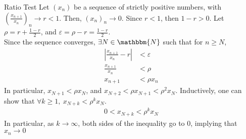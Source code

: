\documentclass[10pt]{extarticle}
\newcommand{\N}{\mathbbm{N}}
\begin{document}
  \begin{problem}{Ratio Test}
    Let $\left(x_n\right)$ be a sequence of strictly positive numbers, with $\left(\frac{x_{n+1}}{x_n}\right)_n \rightarrow r < 1$. Then, $(x_n)_n \rightarrow 0$.
    \tcblower
    Since $r < 1$, then $1-r > 0$. Let $\rho = r + \frac{1-r}{2}$, and $\varepsilon = \rho - r = \frac{1-r}{2}$.\\

    Since the sequence converges, $\exists N\in\N$ such that for $n\geq N$,
    \begin{align*}
      \left|\frac{x_{n+1}}{x_n} - r \right| &< \varepsilon\\
      \frac{x_{n+1}}{x_n} &< \rho\\
      x_{n+1} &< \rho x_n
    \end{align*}
    In particular, $x_{N+1} < \rho x_N$, and $x_{N+2} < \rho x_{N+1} < \rho^2 x_N$. Inductively, one can show that $\forall k\geq 1,~x_{N+k} < \rho^{k}x_{N}$.
    \begin{align*}
      0 < x_{N + k} < \rho^{k}x_{N}
    \end{align*}
    In particular, as $k \rightarrow \infty$, both sides of the inequality go to $0$, implying that $x_{n}\rightarrow 0$
  \end{problem}
\end{document}
